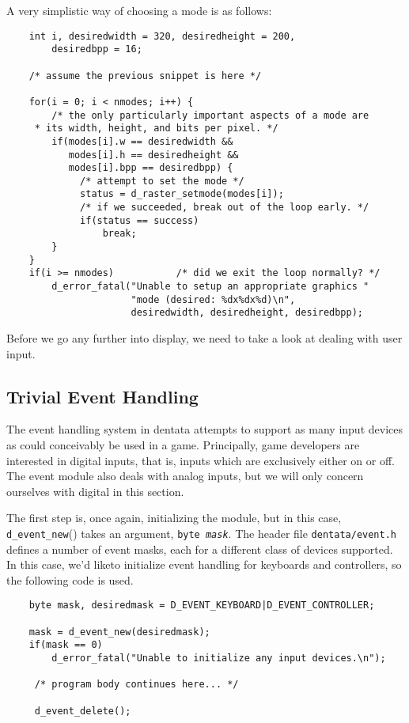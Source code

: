 A very simplistic way of choosing a mode is as follows:
\begin{verbatim}
    int i, desiredwidth = 320, desiredheight = 200,
        desiredbpp = 16;

    /* assume the previous snippet is here */

    for(i = 0; i < nmodes; i++) {
        /* the only particularly important aspects of a mode are
	 * its width, height, and bits per pixel. */
        if(modes[i].w == desiredwidth &&
           modes[i].h == desiredheight &&
           modes[i].bpp == desiredbpp) {
             /* attempt to set the mode */
             status = d_raster_setmode(modes[i]);
             /* if we succeeded, break out of the loop early. */
             if(status == success)
                 break;
        }
    }
    if(i >= nmodes)           /* did we exit the loop normally? */
        d_error_fatal("Unable to setup an appropriate graphics "
                      "mode (desired: %dx%dx%d)\n",
                      desiredwidth, desiredheight, desiredbpp);
\end{verbatim}

Before we go any further into display, we need to take a look at
dealing with user input.

\subsection{Trivial Event Handling}

The event handling system in dentata attempts to support as many input
devices as could conceivably be used in a game. Principally, game
developers are interested in digital inputs, that is, inputs which are
exclusively either on or off. The event module also deals with analog
inputs, but we will only concern ourselves with digital in this
section.

The first step is, once again, initializing the module, but in this
case, {\tt d\_event\_new}() takes an argument, {\tt byte \it mask}.
The header file {\tt dentata/event.h} defines a number of event masks,
each for a different class of devices supported. In this case, we'd
liketo initialize event handling for keyboards and controllers, so
the following code is used.

\begin{verbatim}
    byte mask, desiredmask = D_EVENT_KEYBOARD|D_EVENT_CONTROLLER;

    mask = d_event_new(desiredmask);
    if(mask == 0)
        d_error_fatal("Unable to initialize any input devices.\n");

     /* program body continues here... */

     d_event_delete();
\end{verbatim}

